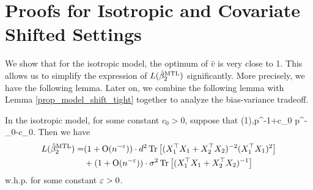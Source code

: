 \section{Proofs for Isotropic and Covariate Shifted Settings}\label{app_iso_cov}




We show that for the isotropic model, the optimum of $\hat v$ is very close to 1.
This allows us to simplify the expression of $L(\hat{\beta}_2^{\text{MTL}})$ significantly.
More precisely, we have the following lemma.
Later on, we combine the following lemma with Lemma \ref{prop_model_shift_tight} together to analyze the bias-variance tradeoff.

\begin{lemma}
In the isotropic model, for some constant $c_0>0$, suppose that
\be\label{choiceofpara}
	 \le \OO(1),\quad p^{-1+c_0} \le {}  \le p^{-\e_0-c_0}.
\ee
Then we have
\begin{align}
L(\hat{\beta}_2^{\text{MTL}})=&(1+\operatorname{O}(n^{-{\varepsilon}}))\cdot d^2 \operatorname{Tr}\left[(X_1^{\top}X_1 +X_2^{\top}X_2)^{-2} (X_1^{\top}X_1)^2\right] \nonumber \\
&+(1+\operatorname{O}(n^{-{\varepsilon}}))\cdot \sigma^2  \operatorname{Tr}\left[(X_1^{\top}X_1  + X_2^{\top}X_2)^{-1} \right]  \label{simple1}
\end{align}
w.h.p. for some constant ${\varepsilon}>0$.
\end{lemma}

